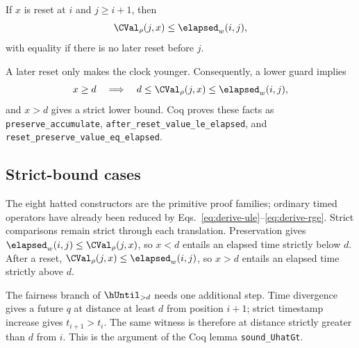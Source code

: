 \begin{lemma}
\label{lem:clock-after-reset}
If $x$ is reset at $i$ and $j\ge i+1$, then
\[
\CVal_\rho(j,x)\le\elapsed_w(i,j),
\]
with equality if there is no later reset before $j$.
\end{lemma}
A later reset only makes the clock younger. Consequently, a lower guard
implies
\begin{equation}
x\ge d\quad\Longrightarrow\quad
d\le\CVal_\rho(j,x)\le\elapsed_w(i,j),
\label{eq:lower-clock}
\end{equation}
and $x>d$ gives a strict lower bound. Coq proves these facts as
\texttt{preserve\_accumulate},
\texttt{after\_reset\_value\_le\_elapsed}, and
\texttt{reset\_preserve\_value\_eq\_elapsed}.

\subsection{Strict-bound cases}
\label{subsec:main-strict-bounds}
The eight hatted constructors are the primitive proof families; ordinary
timed operators have already been reduced by
Eqs.~\eqref{eq:derive-ule}--\eqref{eq:derive-rge}. Strict comparisons remain
strict through each translation. Preservation gives
$\elapsed_w(i,j)\le\CVal_\rho(j,x)$, so $x<d$ entails an elapsed time
strictly below $d$. After a reset,
$\CVal_\rho(j,x)\le\elapsed_w(i,j)$, so $x>d$ entails an elapsed time
strictly above $d$.

The fairness branch of $\hUntil_{>d}$ needs one additional step. Time
divergence gives a future $q$ at distance at least $d$ from position $i+1$;
strict timestamp increase gives $t_{i+1}>t_i$. The same witness is therefore
at distance strictly greater than $d$ from $i$. This is the argument of the
Coq lemma \texttt{sound\_UhatGt}.
